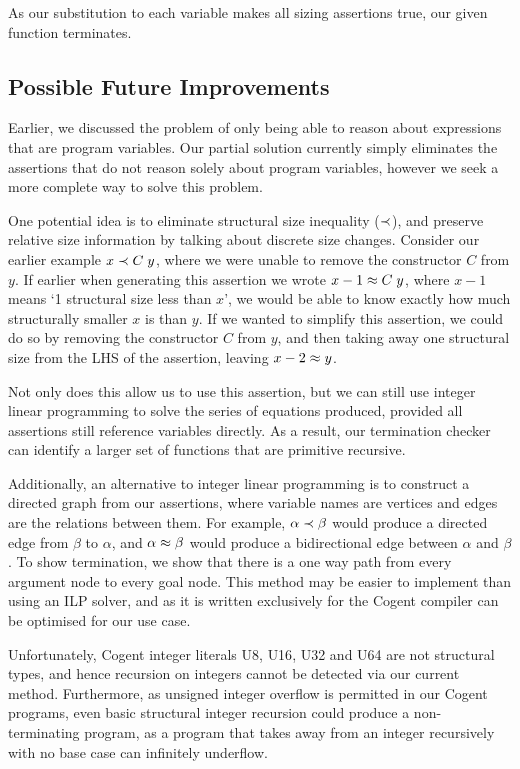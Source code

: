 As our substitution to each variable makes all sizing assertions true,
our given function terminates.

\subsection{Possible Future Improvements}

Earlier, we discussed the problem of only being able to reason about expressions that are
program variables. Our partial solution currently simply eliminates the assertions that
do not reason solely about program variables, however we seek a more complete way to solve
this problem.

One potential idea is to eliminate structural size inequality ($\prec$), and preserve relative
size information by talking about discrete size changes. Consider our earlier example $x \prec C\; y$,
where we were unable to remove the constructor $C$ from $y$. 
If earlier when generating this assertion we wrote  $x - 1 \approx C\; y$,
where $x - 1$ means `1 structural size less than $x$', we would be able to know exactly
how much structurally smaller $x$ is than $y$. If we wanted to simplify this assertion,
we could do so by removing the constructor $C$ from $y$, and then taking away one structural size from
the LHS of the assertion, leaving $x - 2 \approx y$.

Not only does this allow us to use this assertion, but we can still use integer linear programming to
solve the series of equations produced, provided all assertions still reference variables directly.
As a result, our termination checker can identify a larger set of functions that are primitive recursive.

Additionally, an alternative to integer linear programming is to construct a directed graph from
our assertions, where variable names are vertices and edges are the relations
between them. For example, $\alpha \prec \beta$ would produce a directed edge from $\beta$ to
$\alpha$, and $\alpha \approx \beta$ would produce a bidirectional edge between $\alpha$ and $\beta$.
To show termination, we show that there is a one way path from every argument node to every
goal node. This method may be easier to implement than using an ILP solver,
and as it is written exclusively for the Cogent compiler can be optimised
for our use case.

Unfortunately, Cogent integer literals \textsc{U8}, \textsc{U16}, \textsc{U32} and
\textsf{U64} are not structural types, and hence recursion on integers
cannot be detected via our current method. Furthermore, as unsigned integer
overflow is permitted in our Cogent programs, even basic structural integer
recursion could produce a non-terminating program, as a program that takes
away from an integer recursively with no base case can infinitely underflow.

